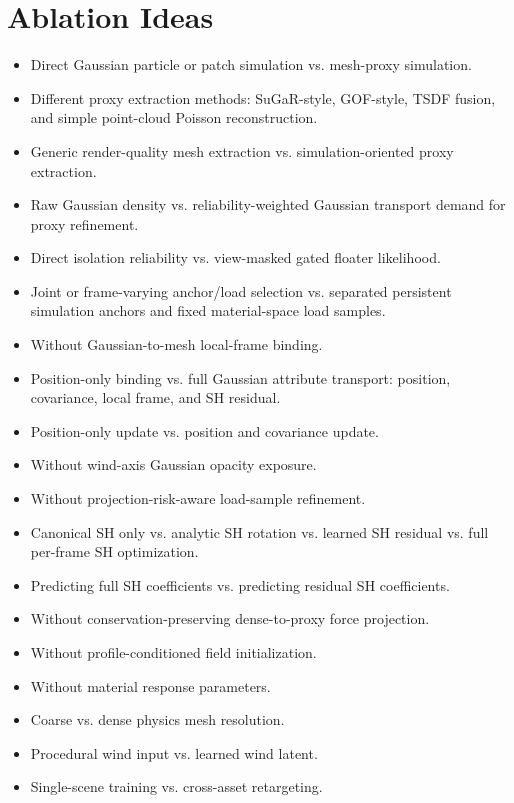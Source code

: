 \documentclass[11pt]{article}
\begin{document}
\section{Ablation Ideas}

\begin{itemize}
  \item Direct Gaussian particle or patch simulation vs. mesh-proxy simulation.
  \item Different proxy extraction methods: SuGaR-style, GOF-style, TSDF fusion, and simple point-cloud Poisson reconstruction.
  \item Generic render-quality mesh extraction vs. simulation-oriented proxy extraction.
  \item Raw Gaussian density vs. reliability-weighted Gaussian transport demand for proxy refinement.
  \item Direct isolation reliability vs. view-masked gated floater likelihood.
  \item Joint or frame-varying anchor/load selection vs. separated persistent simulation anchors and fixed material-space load samples.
  \item Without Gaussian-to-mesh local-frame binding.
  \item Position-only binding vs. full Gaussian attribute transport: position, covariance, local frame, and SH residual.
  \item Position-only update vs. position and covariance update.
  \item Without wind-axis Gaussian opacity exposure.
  \item Without projection-risk-aware load-sample refinement.
  \item Canonical SH only vs. analytic SH rotation vs. learned SH residual vs. full per-frame SH optimization.
  \item Predicting full SH coefficients vs. predicting residual SH coefficients.
  \item Without conservation-preserving dense-to-proxy force projection.
  \item Without profile-conditioned field initialization.
  \item Without material response parameters.
  \item Coarse vs. dense physics mesh resolution.
  \item Procedural wind input vs. learned wind latent.
  \item Single-scene training vs. cross-asset retargeting.
\end{itemize}
\end{document}
